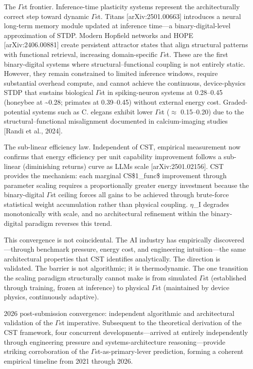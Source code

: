 \documentclass[a4paper,12pt]{article}
\begin{document}
The $\Gamma$st frontier. Inference-time plasticity systems represent the architecturally correct step toward dynamic $\Gamma$st. Titans [arXiv:2501.00663] introduces a neural long-term memory module updated at inference time---a binary-digital-level approximation of STDP. Modern Hopfield networks and HOPE [arXiv:2406.00881] create persistent attractor states that align structural patterns with functional retrieval, increasing domain-specific $\Gamma$st. These are the first binary-digital systems where structural--functional coupling is not entirely static. However, they remain constrained to limited inference windows, require substantial overhead compute, and cannot achieve the continuous, device-physics STDP that sustains biological $\Gamma$st in spiking-neuron systems at 0.28--0.45 (honeybee at \textasciitilde{}0.28; primates at 0.39--0.45) without external energy cost. Graded-potential systems such as C. elegans exhibit lower $\Gamma$st ($\approx$ 0.15--0.20) due to the structural--functional misalignment documented in calcium-imaging studies [Randi et al., 2024].


The sub-linear efficiency law. Independent of CST, empirical measurement now confirms that energy efficiency per unit capability improvement follows a sub-linear (diminishing returns) curve as LLMs scale [arXiv:2501.02156]. CST provides the mechanism: each marginal CS\$1_{func}\$ improvement through parameter scaling requires a proportionally greater energy investment because the binary-digital $\Gamma$st ceiling forces all gains to be achieved through brute-force statistical weight accumulation rather than physical coupling. $\eta$_I degrades monotonically with scale, and no architectural refinement within the binary-digital paradigm reverses this trend.


This convergence is not coincidental. The AI industry has empirically discovered---through benchmark pressure, energy cost, and engineering intuition---the same architectural properties that CST identifies analytically. The direction is validated. The barrier is not algorithmic; it is thermodynamic. The one transition the scaling paradigm structurally cannot make is from simulated $\Gamma$st (established through training, frozen at inference) to physical $\Gamma$st (maintained by device physics, continuously adaptive).


2026 post-submission convergence: independent algorithmic and architectural validation of the $\Gamma$st imperative. Subsequent to the theoretical derivation of the CST framework, four concurrent developments---arrived at entirely independently through engineering pressure and systems-architecture reasoning---provide striking corroboration of the $\Gamma$st-as-primary-lever prediction, forming a coherent empirical timeline from 2021 through 2026.
\end{document}
